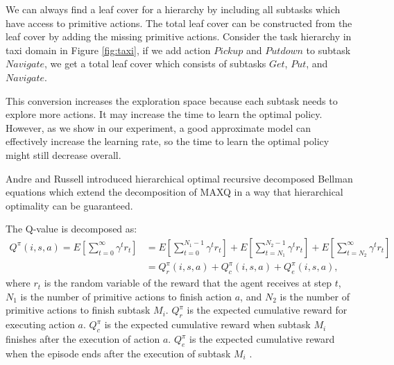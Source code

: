 We can always find a leaf cover for a hierarchy by including all subtasks which have access
to primitive actions. The total leaf cover can be constructed from the leaf cover by
adding the missing primitive actions.
Consider the task hierarchy in taxi domain in Figure \ref{fig:taxi},
if we add action $Pickup$ and $Putdown$ to subtask $Navigate$, 
we get a total leaf cover which consists of subtasks $Get$, $Put$, and $Navigate$.

This conversion increases the exploration space because each subtask needs to explore more actions. It may increase 
the time to learn the optimal policy. However, as we show in our experiment, a good approximate model can effectively increase
the learning rate, so the time to learn the optimal policy might still decrease overall.


Andre and Russell \cite{OptimalQ, HORDQ} introduced hierarchical optimal recursive decomposed Bellman equations
which extend the decomposition of MAXQ in a way that hierarchical optimality
can be guaranteed.

The Q-value is decomposed as:
\begin{align}
    \label{eq:HordQ}
    Q^{\pi}(i, s, a) = E[\sum_{t=0}^{\infty}\gamma^t r_t] &= E[\sum_{t=0}^{N_1 - 1}\gamma^t r_t] + E[\sum_{t=N_1}^{N_2 - 1}\gamma^t r_t] + E[\sum_{t=N_2}^{\infty}\gamma^t r_t]\\
                    &= Q_r^{\pi}(i, s, a) + Q_c^{\pi}(i, s, a) + Q_e^{\pi}(i, s, a),
\end{align}
where $r_t$ is the random variable of the reward that the agent receives at step $t$, $N_1$ is the number of primitive actions to finish action $a$, 
and $N_2$ is the number of primitive actions 
to finish subtask $M_i$. $ Q_r^{\pi}$ is the expected cumulative reward for executing action $a$.
$Q_c^{\pi}$ is the expected cumulative reward when subtask $M_i$ finishes after the execution of action $a$. 
$Q_e^{\pi}$ is the expected cumulative reward when the episode ends after the execution of subtask $M_i$ .

